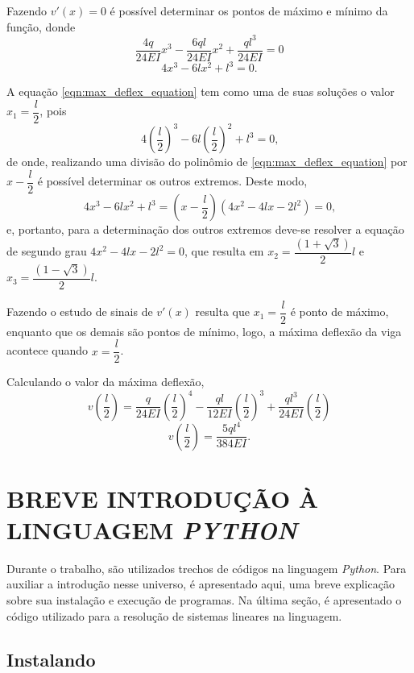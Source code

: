 \documentclass[
	12pt,				%
	openright,			%
    twoside,			%
	a4paper,			%
	chapter=TITLE,		%
	english,			%
	french,				%
	spanish,			%
	brazil				%
	]{abntex2}
\numberwithin{lema}{chapter}
\numberwithin{teorema}{chapter}
\numberwithin{definicao}{chapter}
\numberwithin{exemplo}{chapter}
\numberwithin{figure}{chapter}
\begin{document}
\begin{apendicesenv}
{	Fazendo $v'(x)=0$ é possível determinar os pontos de máximo e mínimo da função, donde
	$$
		\frac{4q}{24EI}x^3
		-
		\frac{6ql}{24EI}x^2
		+
		\frac{ql^3}{24EI}
		= 0
	$$
	\begin{equation}
		\label{eqn:max_deflex_equation}
		4x^3 - 6lx^2 + l^3 = 0
		\text{.}
	\end{equation}
	
	A equação \eqref{eqn:max_deflex_equation} tem como uma de suas soluções o valor $x_1=\dfrac{l}{2}$, pois
	$$
		4\left (\frac{l}{2}\right )^3 - 6l\left ( \frac{l}{2}\right )^2+l^3=0
		\text{,}
	$$
	de onde, realizando uma divisão do polinômio de \eqref{eqn:max_deflex_equation} por $x-\dfrac{l}{2}$ é possível determinar os outros extremos. Deste modo,
	$$
		4x^3-6lx^2+l^3 = (x-\frac{l}{2})(4x^2-4lx-2l^2)=0
		\text{,}
	$$
	e, portanto, para a determinação dos outros extremos deve-se resolver a equação de segundo grau $4x^2-4lx-2l^2=0$, que resulta em $x_2=\dfrac{(1+\sqrt{3})}{2}l$ e $x_3=\dfrac{(1-\sqrt{3})}{2}l$.
	
	Fazendo o estudo de sinais de $v'(x)$ resulta que $x_1=\dfrac{l}{2}$ é ponto de máximo, enquanto que os demais são pontos de mínimo, logo, a máxima deflexão da viga acontece quando $x=\dfrac{l}{2}$.
	
	Calculando o valor da máxima deflexão,
	$$
		v\left (\frac{l}{2}\right )=
			\frac{q}{24EI} \left (
				\frac{l}{2}
			\right )^4
			-
			\frac{ql}{12EI} \left (
				\frac{l}{2}
			\right )^3
			+
			\frac{ql^3}{24EI}\left (
				\frac{l}{2}
			\right )
	$$
	\begin{equation}
	\label{eqn:max_deflex_resultado}
		v\left (\frac{l}{2}\right )=
			\frac{5ql^4}{384EI}
			\text{.}
	\end{equation}
}

\chapter{BREVE INTRODUÇÃO À LINGUAGEM \textit{PYTHON}}
\label{apend:python}
{
	Durante o trabalho, são utilizados trechos de códigos na linguagem \textit{Python}. Para auxiliar a introdução nesse universo, é apresentado aqui, uma breve explicação sobre sua instalação e execução de programas. Na última seção, é apresentado o código utilizado para a resolução de sistemas lineares na linguagem.

	\section{Instalando}
	
}
\end{apendicesenv}
\end{document}
